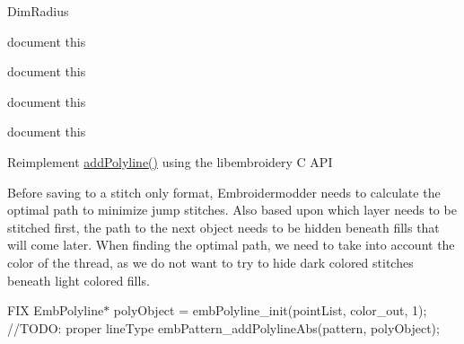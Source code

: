 \begin{DoxyRefList}
Dim\+Radius  
\item[Member \mbox{\hyperlink{classPropertyEditor_af77a9b50a881ba48136c67f40c274e1e}{Property\+Editor\+::create\+Combo\+Box\+Selected}} ()]\label{todo__todo000021}%
%
document this  
\item[Member \mbox{\hyperlink{classPropertyEditor_a25880d96f0b4466fc4342255adaa7022}{Property\+Editor\+::create\+Tool\+Button\+QSelect}} ()]\label{todo__todo000022}%
%
document this  
\item[Member \mbox{\hyperlink{classPropertyEditor_ad7452c5931d2f0c7f63a308d1ccccfc7}{Property\+Editor\+::event\+Filter}} (QObject $\ast$obj, QEvent $\ast$event)]\label{todo__todo000020}%
%
document this  
\item[Member \mbox{\hyperlink{classPropertyEditor_a4bca2abc45a97402b7135f7b8407d125}{Property\+Editor\+::$\sim$\+Property\+Editor}} ()]\label{todo__todo000019}%
%
document this  
\item[Member \mbox{\hyperlink{classSaveObject_ae11f893d999e959825a7ee160b269e51}{Save\+Object\+::add\+Path}} (Emb\+Pattern $\ast$pattern, QGraphics\+Item $\ast$item)]\label{todo__todo000017}%
%
Reimplement \mbox{\hyperlink{classSaveObject_ace37a0a25fcffac8075e6814ed54255a}{add\+Polyline()}} using the libembroidery C API  
\item[Member \mbox{\hyperlink{classSaveObject_a450a41fe8347cc65b1c72caeeab38e67}{Save\+Object\+::save}} (QString file\+Name)]\label{todo__todo000016}%
%
Before saving to a stitch only format, Embroidermodder needs to calculate the optimal path to minimize jump stitches. Also based upon which layer needs to be stitched first, the path to the next object needs to be hidden beneath fills that will come later. When finding the optimal path, we need to take into account the color of the thread, as we do not want to try to hide dark colored stitches beneath light colored fills.  
\item[Member \mbox{\hyperlink{classSaveObject_a0d041d54c0440f2ea8393c67df3c25a9}{Save\+Object\+::to\+Polyline}} (Emb\+Pattern $\ast$pattern, const QPointF \&obj\+Pos, const QPainter\+Path \&obj\+Path, QString layer, const QColor \&color, QString line\+Type, QString line\+Weight)]\label{todo__todo000018}%
%
FIX Emb\+Polyline$\ast$ poly\+Object = emb\+Polyline\+\_\+init(point\+List, color\+\_\+out, 1); //\+TODO\+: proper line\+Type emb\+Pattern\+\_\+add\+Polyline\+Abs(pattern, poly\+Object);  

\end{DoxyRefList}
